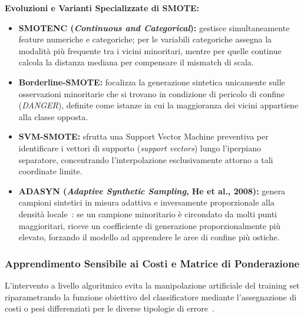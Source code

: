 \textbf{Evoluzioni e Varianti Specializzate di SMOTE:}
\begin{itemize}
    \item \textbf{SMOTENC (\textit{Continuous and Categorical}):} gestisce simultaneamente feature numeriche e categoriche; per le variabili categoriche assegna la modalità più frequente tra i vicini minoritari, mentre per quelle continue calcola la distanza mediana per compensare il mismatch di scala.
    \item \textbf{Borderline-SMOTE:} focalizza la generazione sintetica unicamente sulle osservazioni minoritarie che si trovano in condizione di pericolo di confine (\textit{DANGER}), definite come istanze in cui la maggioranza dei vicini appartiene alla classe opposta.
    \item \textbf{SVM-SMOTE:} sfrutta una Support Vector Machine preventiva per identificare i vettori di supporto (\textit{support vectors}) lungo l'iperpiano separatore, concentrando l'interpolazione esclusivamente attorno a tali coordinate limite.
    \item \textbf{ADASYN (\textit{Adaptive Synthetic Sampling}, He et al., 2008):} genera campioni sintetici in misura adattiva e inversamente proporzionale alla densità locale~\cite{he2008}: se un campione minoritario è circondato da molti punti maggioritari, riceve un coefficiente di generazione proporzionalmente più elevato, forzando il modello ad apprendere le aree di confine più ostiche.
\end{itemize}

\FloatBarrier
\subsubsection{Apprendimento Sensibile ai Costi e Matrice di Ponderazione}
\label{subsec:dm-cost-sensitive}

L'intervento a livello algoritmico evita la manipolazione artificiale del training set riparametrando la funzione obiettivo del classificatore mediante l'assegnazione di costi o pesi differenziati per le diverse tipologie di errore~\cite{mannocci2026imbalanced}.

